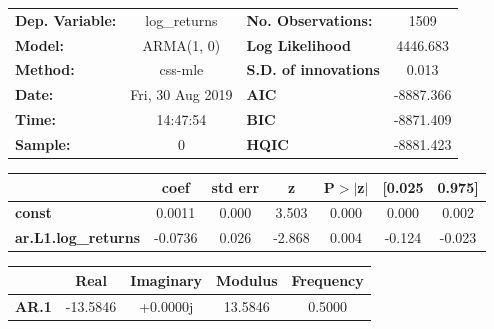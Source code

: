 \begin{center}
\begin{tabular}{lclc}
\toprule
\textbf{Dep. Variable:}     &        log\_returns       & \textbf{  No. Observations:  } &            1509            \\
\textbf{Model:}             &         ARMA(1, 0)        & \textbf{  Log Likelihood     } &          4446.683          \\
\textbf{Method:}            &          css-mle          & \textbf{  S.D. of innovations} &           0.013            \\
\textbf{Date:}              &      Fri, 30 Aug 2019     & \textbf{  AIC                } &         -8887.366          \\
\textbf{Time:}              &          14:47:54         & \textbf{  BIC                } &         -8871.409          \\
\textbf{Sample:}            &             0             & \textbf{  HQIC               } &         -8881.423          \\
\bottomrule
\end{tabular}
\begin{tabular}{lcccccc}
                            & \textbf{coef} & \textbf{std err} & \textbf{z} & \textbf{P$> |$z$|$} & \textbf{[0.025} & \textbf{0.975]}  \\
\midrule
\textbf{const}              &       0.0011  &        0.000     &     3.503  &         0.000        &        0.000    &        0.002     \\
\textbf{ar.L1.log\_returns} &      -0.0736  &        0.026     &    -2.868  &         0.004        &       -0.124    &       -0.023     \\
\bottomrule
\end{tabular}
\begin{tabular}{lcccc}
              & \textbf{            Real} & \textbf{         Imaginary} & \textbf{         Modulus} & \textbf{        Frequency}  \\
\midrule
\textbf{AR.1} &              -13.5846     &                +0.0000j     &               13.5846     &                0.5000       \\
\bottomrule
\end{tabular}
\end{center}
